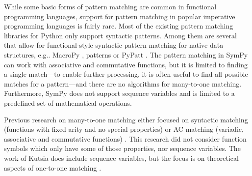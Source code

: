\documentclass[conference,compsoc]{IEEEtran}
\makeatletter
\DeclareRobustCommand\onedot{\futurelet\@let@token\@onedot}
\def\@onedot{\ifx\@let@token.\else.\null\fi\xspace}
\def\eg{{e.g}\onedot} \def\Eg{{E.g}\onedot}
\makeatother
\begin{document}
While some basic forms of pattern matching are common in functional programming languages, support for pattern matching in popular imperative programming languages is fairly rare.
Most of the existing pattern matching libraries for Python only support syntactic patterns.
Among them are several that allow for functional-style syntactic pattern matching for native data structures, \eg MacroPy \cite{MacroPy}, patterns \cite{patterns} or PyPatt \cite{PyPatt}.
The pattern matching in SymPy \cite{SymPy} can work with associative and
commutative functions, but it is limited to finding a single match---to enable
further processing, it is often
useful to find all possible matches for a pattern---and there are no algorithms for many-to-one matching.
Furthermore, SymPy does not support sequence variables and is limited to a predefined set of mathematical operations.

Previous research on many-to-one matching either focused on syntactic matching (functions with fixed arity and no special properties) \cite{Christian1993,Graef1991,Nedjah1997}
or AC matching (variadic, associative and commutative functions) \cite{Kounalis1991,Bachmair1993,Lugiez1994,Bachmair1995,Eker1995,Kirchner2001}. This research did not consider function symbols which only have some of those properties, nor sequence variables. The work of Kutsia does include sequence variables, but the focus is on theoretical aspects of one-to-one matching \cite{Kutsia2006,Kutsia2007}.


\end{document}
